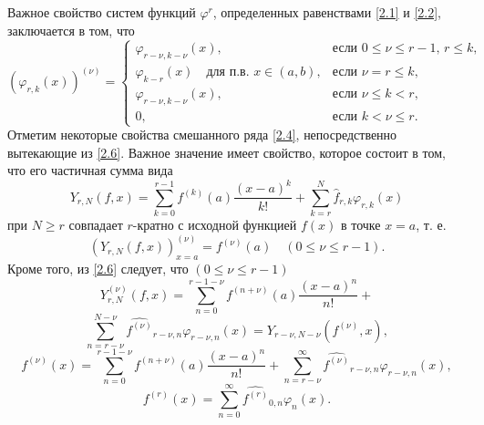 Важное свойство систем функций $\varphi^r$, определенных равенствами  \eqref{2.1} и \eqref{2.2}, заключается в том, что
\begin{equation}\label{2.6}
(\varphi_{r,k}(x))^{(\nu)} =\begin{cases}\varphi_{r-\nu,k-\nu}(x),&\text{если $0\le\nu\le r-1$, $r\le k$,}\\
\varphi_{k-r}(x)\quad\text{для п.в. $x\in (a,b)$},&\text{если  $\nu=r\le k$,}\\
\varphi_{r-\nu,k-\nu}(x),&\text{если $\nu\le k< r$,}\\
0,&\text{если $k< \nu\le r$}.
\end{cases}
\end{equation}
Отметим некоторые свойства смешанного ряда \eqref{2.4}, непосредственно вытекающие из \eqref{2.6}. Важное значение имеет свойство, которое состоит в том, что его частичная сумма вида
\begin{equation}\label{2.7}
Y_{r,N}(f,x)=\sum_{k=0}^{r-1} f^{(k)}(a)\frac{(x-a)^k}{k!}+ \sum_{k=r}^{N} \hat f_{r,k}\varphi_{r,k}(x)
\end{equation}
при   $N\ge r$ совпадает  $r$-кратно с исходной функцией $f(x)$ в точке $x=a$, т. е.
\begin{equation}\label{2.8}
(Y_{r,N}(f,x))^{(\nu)}_{x=a}=f^{(\nu)}(a)\quad (0\le\nu\le r-1).
\end{equation}
Кроме того, из \eqref{2.6}  следует, что $(0\le\nu\le r-1)$
$$
Y_{r,N}^{(\nu)}(f,x)=\sum_{n=0}^{r-1-\nu} f^{(n+\nu)}(a)\frac{(x-a)^n}{n!}+
$$
\begin{equation}\label{2.9}
\sum_{n=r-\nu}^{N-\nu} \widehat{f^{(\nu)}}_{r-\nu,n}\varphi_{r-\nu,n}(x)=Y_{r-\nu,N-\nu}(f^{(\nu)},x),
\end{equation}
\begin{equation*}
f^{(\nu)}(x)=\sum_{n=0}^{r-1-\nu} f^{(n+\nu)}(a)\frac{(x-a)^n}{n!}+ \sum_{n=r-\nu}^\infty \widehat{f^{(\nu)}}_{r-\nu,n}\varphi_{r-\nu,n}(x),
\end{equation*}
\begin{equation*}
f^{(r)}(x)=\sum_{n=0}^\infty \widehat{f^{(r)}}_{0,n}\varphi_{n}(x).
\end{equation*}

